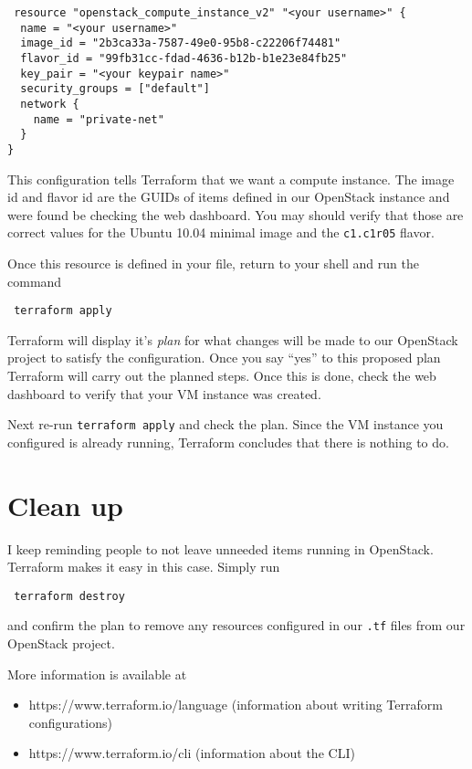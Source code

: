 \documentclass{article}
\begin{document}
\begin{verbatim}
 resource "openstack_compute_instance_v2" "<your username>" {
  name = "<your username>"
  image_id = "2b3ca33a-7587-49e0-95b8-c22206f74481"
  flavor_id = "99fb31cc-fdad-4636-b12b-b1e23e84fb25"
  key_pair = "<your keypair name>"
  security_groups = ["default"]
  network {
    name = "private-net"
  }
}
\end{verbatim}

This configuration tells Terraform that we want a compute instance. The image id and flavor id are the GUIDs
of items defined in our OpenStack instance and were found be checking the web dashboard. You may 
should verify that those are correct values for the Ubuntu 10.04 minimal image and the \texttt{c1.c1r05}
flavor.

Once this resource is defined in your file, return to your shell and run the command

\begin{verbatim}
 terraform apply
\end{verbatim}

Terraform will display it's \emph{plan} for what changes will be made to our OpenStack project
to satisfy the configuration. Once you say ``yes'' to this proposed plan Terraform will carry out 
the planned steps. Once this is done, check the web dashboard to verify that your VM instance
was created.

Next re-run \texttt{terraform apply} and check the plan. Since the VM instance you configured is already
running, Terraform concludes that there is nothing to do.

\section{Clean up}
I keep reminding people to not leave unneeded items running in OpenStack. Terraform makes it easy in this case.
Simply run 

\begin{verbatim}
 terraform destroy
\end{verbatim}

and confirm the plan to remove any resources configured in our \texttt{.tf} files from our
OpenStack project.

More information is available at 
\begin{itemize}
  \item https://www.terraform.io/language (information about writing Terraform configurations)
  \item https://www.terraform.io/cli (information about the CLI)
\end{itemize}  
\end{document}
